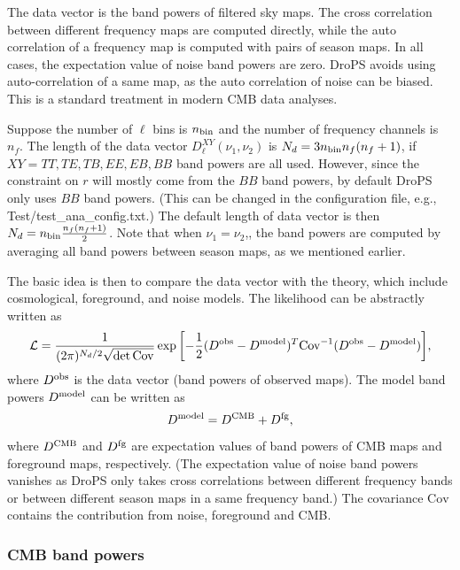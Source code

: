 \documentclass[12pt, a4paper]{ctexart} %
\begin{document}
The data vector is the band powers of filtered sky maps. The cross correlation between different frequency maps are computed directly, while the auto correlation of a frequency map is computed with pairs of season maps. In all cases, the expectation value of noise band powers are zero. DroPS avoids using auto-correlation of a same map, as the auto correlation of noise can be biased. This is a standard treatment in modern CMB data analyses. 

Suppose the number of $\ell$ bins is $n_{\rm bin}$ and the number of frequency channels is $n_f$. The length of the data vector $D^{XY}_\ell(\nu_1,\nu_2)$ is $N_d=3 n_{\rm bin} n_f(n_f+1)$, if $XY = TT, TE, TB, EE, EB, BB$ band powers are all used. However, since the constraint on $r$ will mostly come from the $BB$ band powers, by default DroPS only uses $BB$ band powers. (This can be changed in the configuration file, e.g., Test/test\_ana\_config.txt.) The default length of data vector is then $N_d = n_{\rm bin}\frac{n_f(n_f+1)}{2}$.  Note that when $\nu_1=\nu_2$,, the band powers are computed by averaging all band powers between season maps,  as we mentioned earlier.

The basic idea is then to compare the data vector with the theory, which include cosmological, foreground, and noise models. The likelihood can be abstractly written as
\begin{equation}
  \mathcal{L} = \frac{1}{(2\pi)^{N_d/2}\sqrt{\det\mathrm{Cov}}} \exp{\left[-\frac{1}{2}(D^{\rm obs} - D^{\rm model})^T\mathrm{Cov}^{-1}(D^{\rm obs} - D^{\rm model})\right]},
\end{equation}
where $D^{\rm obs}$ is the data vector (band powers of observed maps). The model band powers $D^{\rm model}$ can be written as
\begin{equation}
  D^{\rm model} = D^{\rm CMB} + D^{\rm fg},
\end{equation}
where $D^{\rm CMB}$ and $D^{\rm fg}$ are expectation values of band powers of CMB maps and foreground maps, respectively. (The expectation value of noise band powers vanishes as DroPS only takes cross correlations between different frequency bands or between different season maps in a same frequency band.) The covariance $\mathrm{Cov}$ contains the contribution from noise, foreground and CMB. 

\subsubsection{CMB band powers}
\end{document}
